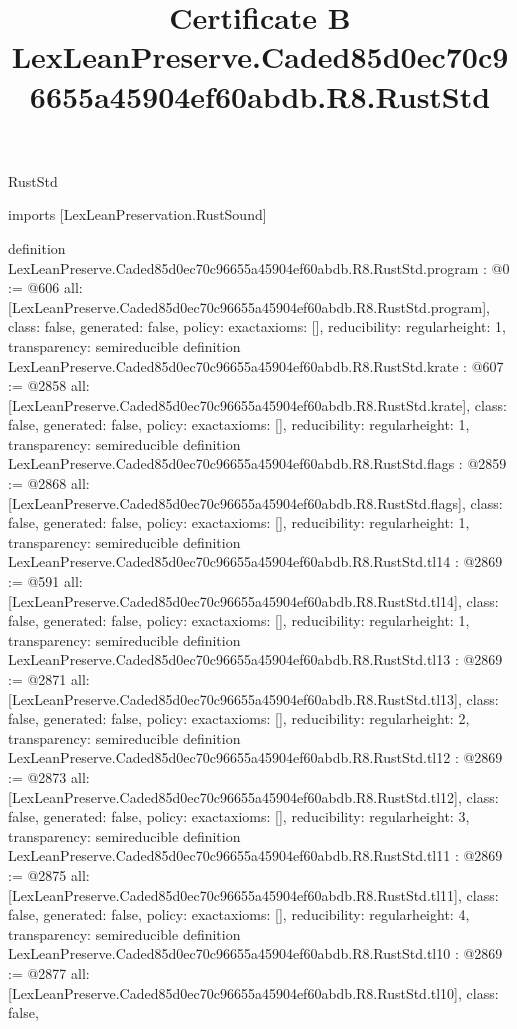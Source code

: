 \begin{lexlean}{RustStd}
\title{Certificate B LexLeanPreserve.Caded85d0ec70c96655a45904ef60abdb.R8.RustStd}
\begin{coremodule}
imports [LexLeanPreservation.RustSound]

definition LexLeanPreserve.Caded85d0ec70c96655a45904ef60abdb.R8.RustStd.program : @0 := @606 {
  all: [LexLeanPreserve.Caded85d0ec70c96655a45904ef60abdb.R8.RustStd.program],
  class: false,
  generated: false,
  policy: exact{axioms: []},
  reducibility: regular{height: 1},
  transparency: semireducible
}
definition LexLeanPreserve.Caded85d0ec70c96655a45904ef60abdb.R8.RustStd.krate : @607 := @2858 {
  all: [LexLeanPreserve.Caded85d0ec70c96655a45904ef60abdb.R8.RustStd.krate],
  class: false,
  generated: false,
  policy: exact{axioms: []},
  reducibility: regular{height: 1},
  transparency: semireducible
}
definition LexLeanPreserve.Caded85d0ec70c96655a45904ef60abdb.R8.RustStd.flags : @2859 := @2868 {
  all: [LexLeanPreserve.Caded85d0ec70c96655a45904ef60abdb.R8.RustStd.flags],
  class: false,
  generated: false,
  policy: exact{axioms: []},
  reducibility: regular{height: 1},
  transparency: semireducible
}
definition LexLeanPreserve.Caded85d0ec70c96655a45904ef60abdb.R8.RustStd.tl14 : @2869 := @591 {
  all: [LexLeanPreserve.Caded85d0ec70c96655a45904ef60abdb.R8.RustStd.tl14],
  class: false,
  generated: false,
  policy: exact{axioms: []},
  reducibility: regular{height: 1},
  transparency: semireducible
}
definition LexLeanPreserve.Caded85d0ec70c96655a45904ef60abdb.R8.RustStd.tl13 : @2869 := @2871 {
  all: [LexLeanPreserve.Caded85d0ec70c96655a45904ef60abdb.R8.RustStd.tl13],
  class: false,
  generated: false,
  policy: exact{axioms: []},
  reducibility: regular{height: 2},
  transparency: semireducible
}
definition LexLeanPreserve.Caded85d0ec70c96655a45904ef60abdb.R8.RustStd.tl12 : @2869 := @2873 {
  all: [LexLeanPreserve.Caded85d0ec70c96655a45904ef60abdb.R8.RustStd.tl12],
  class: false,
  generated: false,
  policy: exact{axioms: []},
  reducibility: regular{height: 3},
  transparency: semireducible
}
definition LexLeanPreserve.Caded85d0ec70c96655a45904ef60abdb.R8.RustStd.tl11 : @2869 := @2875 {
  all: [LexLeanPreserve.Caded85d0ec70c96655a45904ef60abdb.R8.RustStd.tl11],
  class: false,
  generated: false,
  policy: exact{axioms: []},
  reducibility: regular{height: 4},
  transparency: semireducible
}
definition LexLeanPreserve.Caded85d0ec70c96655a45904ef60abdb.R8.RustStd.tl10 : @2869 := @2877 {
  all: [LexLeanPreserve.Caded85d0ec70c96655a45904ef60abdb.R8.RustStd.tl10],
  class: false,
}
\end{coremodule}
\end{lexlean}
